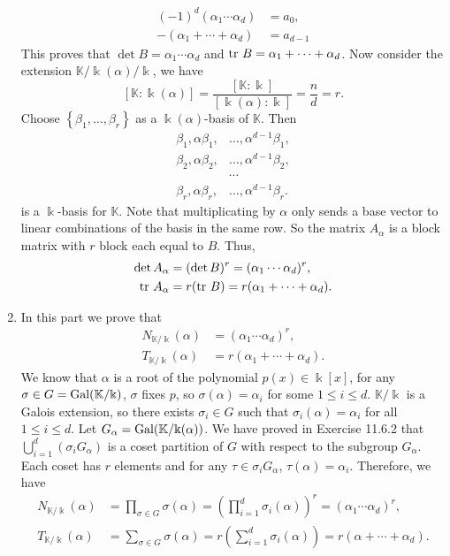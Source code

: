 \documentclass[a4paper, 12pt]{article}
\begin{document}
\begin{solution}
\begin{enumerate}[(1)]
\begin{align*}
    (-1)^d (\alpha_1\cdots \alpha_d)&=a_0,\\ 
    -(\alpha_1+\cdots+\alpha_d)&=a_{d-1}
\end{align*} 
This proves that \(\det B=\alpha_1\cdots \alpha_d\) and \(\text{tr}\  B=\alpha_1+\cdots +\alpha_d\). Now consider the extension \(\mathbb{K}/\Bbbk(\alpha)/\Bbbk\), we have 
\[[\mathbb{K}:\Bbbk(\alpha)]=\frac{[\mathbb{K}:\Bbbk]}{[\Bbbk(\alpha):\Bbbk]}=\frac{n}{d}=r.\]
Choose \(\left\{ \beta_1,\ldots,\beta_r \right\}\) as a \(\Bbbk(\alpha)\)-basis of \(\mathbb{K}\). Then 
\begin{align*}
    \beta_1,\alpha\beta_1,&\ldots,\alpha^{d-1}\beta_1,\\ 
    \beta_2,\alpha\beta_2,&\ldots,\alpha^{d-1}\beta_2,\\ 
    &\cdots\\ 
    \beta_r,\alpha\beta_r,&\ldots,\alpha^{d-1}\beta_r.
\end{align*}
is a \(\Bbbk\)-basis for \(\mathbb{K}\). Note that multiplicating by \(\alpha\) only sends a base vector to linear combinations of the basis in the same row. So the matrix \(A_\alpha\) is a block matrix with \(r\) block each equal to \(B\). Thus, 
\begin{align*}
    \det A_\alpha&=(\det B)^r=(\alpha_1\cdots \alpha_d)^r,\\ 
    \text{tr}\  A_\alpha&=r(\text{tr}\  B)=r(\alpha_1+\cdots+\alpha_d).
\end{align*}
\item In this part we prove that 
\begin{align*}
    N_{\mathbb{K}/\Bbbk}(\alpha)&=(\alpha_1\cdots \alpha_d)^r,\\ 
    T_{\mathbb{K}/\Bbbk}(\alpha)&=r(\alpha_1+\cdots +\alpha_d).
\end{align*}
We know that \(\alpha\) is a root of the polynomial \(p(x)\in \Bbbk[x]\), for any \(\sigma\in G=\text{Gal}(\mathbb{K}/\Bbbk)\), \(\sigma\) fixes \(p\), so \(\sigma(\alpha)=\alpha_i\) for some \(1\leq i\leq d\). \(\mathbb{K}/\Bbbk\) is a Galois extension, so 
there exists \(\sigma_i\in G\) such that \(\sigma_i(\alpha)=\alpha_i\) for all \(1\leq i\leq d\). Let \(G_\alpha=\text{Gal}(\mathbb{K}/\Bbbk(\alpha))\). We have proved in Exercise 11.6.2 that \(\bigcup_{i=1}^d (\sigma_iG_\alpha)\) is a coset partition of \(G\) with respect to the subgroup \(G_\alpha\). Each coset has 
\(r\) elements and for any \(\tau\in \sigma_iG_\alpha\), \(\tau(\alpha)=\alpha_i\). Therefore, we have 
\begin{align*}
N_{\mathbb{K}/\Bbbk}(\alpha)&=\prod_{\sigma\in G}\sigma(\alpha)=(\prod_{i=1}^d \sigma_i(\alpha))^r=(\alpha_1\cdots \alpha_d)^r,\\ 
T_{\mathbb{K}/\Bbbk}(\alpha)&=\sum_{\sigma\in G}\sigma(\alpha)=r(\sum_{i=1}^d \sigma_i(\alpha))=r(\alpha+\cdots+\alpha_d).
\end{align*}

\end{enumerate} 
\end{solution}
\end{document}
